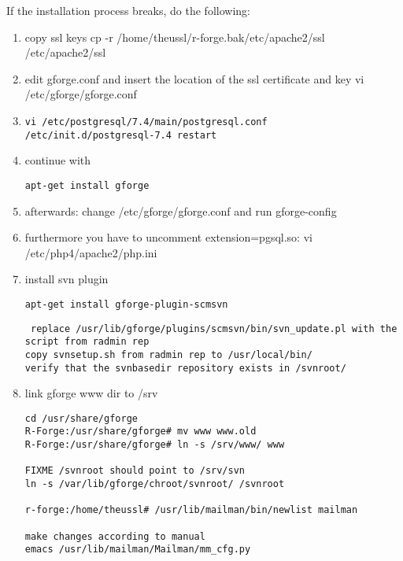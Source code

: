 \documentclass[a4paper]{article}
\begin{document}
If the installation process breaks, do the following:
\begin{enumerate}
\item copy ssl keys
cp -r /home/theussl/r-forge.bak/etc/apache2/ssl /etc/apache2/ssl
\item edit gforge.conf and insert the location of the ssl certificate and key
vi /etc/gforge/gforge.conf
\item 
\begin{lstlisting}
vi /etc/postgresql/7.4/main/postgresql.conf
/etc/init.d/postgresql-7.4 restart
\end{lstlisting}

\item continue with 

\begin{lstlisting}[frame=single, framerule=0.95pt]
apt-get install gforge
\end{lstlisting}

\item afterwards: change /etc/gforge/gforge.conf and run
gforge-config
\item furthermore you have to uncomment extension=pgsql.so:
vi /etc/php4/apache2/php.ini

\item install svn plugin

\begin{lstlisting}[frame=single, framerule=0.95pt]
apt-get install gforge-plugin-scmsvn
\end{lstlisting}

\begin{lstlisting} replace /usr/lib/gforge/plugins/scmsvn/bin/svn_update.pl with the script from radmin rep
copy svnsetup.sh from radmin rep to /usr/local/bin/
verify that the svnbasedir repository exists in /svnroot/
\end{lstlisting}

\item link gforge www dir to /srv
\begin{lstlisting}
cd /usr/share/gforge
R-Forge:/usr/share/gforge# mv www www.old
R-Forge:/usr/share/gforge# ln -s /srv/www/ www

FIXME /svnroot should point to /srv/svn
ln -s /var/lib/gforge/chroot/svnroot/ /svnroot

r-forge:/home/theussl# /usr/lib/mailman/bin/newlist mailman

make changes according to manual
emacs /usr/lib/mailman/Mailman/mm_cfg.py
\end{lstlisting}
\end{enumerate}
\end{document}

